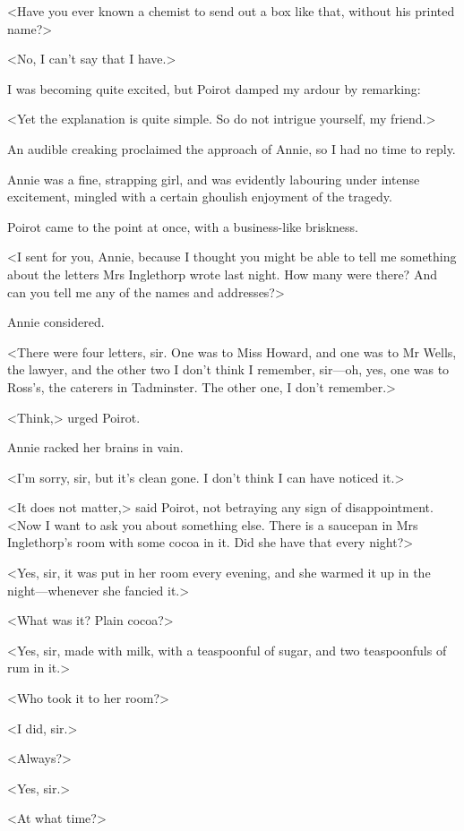  <Have you ever known a chemist to send out a box like that, without his printed name?> 

 <No, I can't say that I have.> 

 I was becoming quite excited, but Poirot damped my ardour by remarking: 

 <Yet the explanation is quite simple. So do not intrigue yourself, my friend.> 

 An audible creaking proclaimed the approach of Annie, so I had no time to reply. 

 Annie was a fine, strapping girl, and was evidently labouring under intense excitement, mingled with a certain ghoulish enjoyment of the tragedy. 

 Poirot came to the point at once, with a business-like briskness. 

 <I sent for you, Annie, because I thought you might be able to tell me something about the letters Mrs Inglethorp wrote last night. How many were there? And can you tell me any of the names and addresses?> 

 Annie considered. 

 <There were four letters, sir. One was to Miss Howard, and one was to Mr Wells, the lawyer, and the other two I don't think I remember, sir—oh, yes, one was to Ross's, the caterers in Tadminster. The other one, I don't remember.> 

 <Think,> urged Poirot. 

 Annie racked her brains in vain. 

 <I'm sorry, sir, but it's clean gone. I don't think I can have noticed it.> 

 <It does not matter,> said Poirot, not betraying any sign of disappointment. <Now I want to ask you about something else. There is a saucepan in Mrs Inglethorp's room with some cocoa in it. Did she have that every night?> 

 <Yes, sir, it was put in her room every evening, and she warmed it up in the night—whenever she fancied it.> 

 <What was it? Plain cocoa?> 

 <Yes, sir, made with milk, with a teaspoonful of sugar, and two teaspoonfuls of rum in it.> 

 <Who took it to her room?> 

 <I did, sir.> 

 <Always?> 

 <Yes, sir.> 

 <At what time?> 

